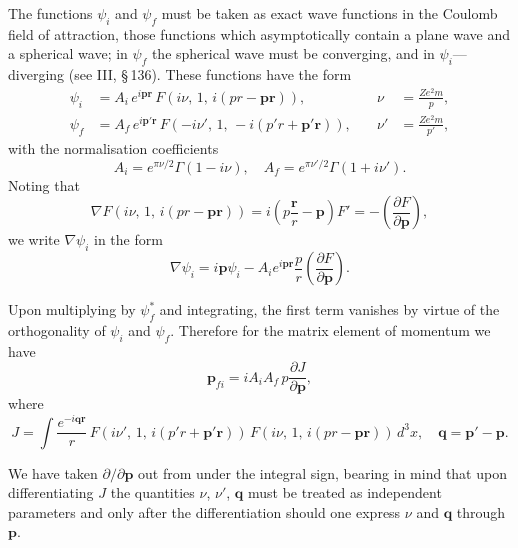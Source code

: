 The functions $\psi_i$ and $\psi_f$ must be taken as exact wave functions in the Coulomb field of attraction, those functions which asymptotically contain a plane wave and a spherical wave; in $\psi_f$ the spherical wave must be converging, and in $\psi_i$---diverging (see III, \S\,136). These functions have the form
\begin{equation}
\begin{aligned}
\psi_i &= A_i\,e^{i\mathbf{pr}}\,F(i\nu,\,1,\,i(pr - \mathbf{pr})), \quad &\nu &= \frac{Ze^2 m}{p}, \\
\psi_f &= A_f\,e^{i\mathbf{p}'\mathbf{r}}\,F(-i\nu',\,1,\,-i(p'r + \mathbf{p}'\mathbf{r})), \quad &\nu' &= \frac{Ze^2 m}{p'},
\end{aligned}
\label{eq:92.5}
\end{equation}
with the normalisation coefficients
\begin{equation}
A_i = e^{\pi\nu/2}\Gamma(1 - i\nu), \quad A_f = e^{\pi\nu'/2}\Gamma(1 + i\nu').
\label{eq:92.6}
\end{equation}
Noting that
\[
\nabla F(i\nu,\,1,\,i(pr - \mathbf{pr})) = i\left(p\frac{\mathbf{r}}{r} - \mathbf{p}\right)F' = -\left(\frac{\partial F}{\partial\mathbf{p}}\right),
\]
we write $\nabla\psi_i$ in the form
\[
\nabla\psi_i = i\mathbf{p}\psi_i - A_i e^{i\mathbf{pr}}\frac{p}{r}\left(\frac{\partial F}{\partial\mathbf{p}}\right).
\]

Upon multiplying by $\psi_f^*$ and integrating, the first term vanishes by virtue of the orthogonality of $\psi_i$ and $\psi_f$. Therefore for the matrix element of momentum we have
\begin{equation}
\mathbf{p}_{fi} = iA_iA_f\,p\frac{\partial J}{\partial\mathbf{p}},
\label{eq:92.7}
\end{equation}
where
\begin{equation}
J = \int \frac{e^{-i\mathbf{qr}}}{r}\,F(i\nu',\,1,\,i(p'r + \mathbf{p}'\mathbf{r}))\,F(i\nu,\,1,\,i(pr - \mathbf{pr}))\,d^3x, \quad \mathbf{q} = \mathbf{p}' - \mathbf{p}.
\label{eq:92.8a}
\end{equation}


We have taken $\partial/\partial\mathbf{p}$ out from under the integral sign, bearing in mind that upon differentiating $J$ the quantities $\nu$, $\nu'$, $\mathbf{q}$ must be treated as independent parameters and only after the differentiation should one express $\nu$ and $\mathbf{q}$ through $\mathbf{p}$.

